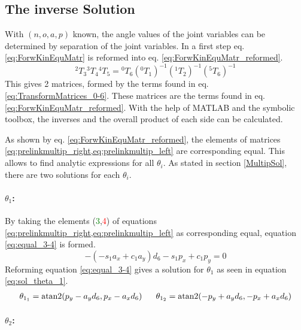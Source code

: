 \subsection{The inverse Solution} \label{InverseSol}
With $ (n,o,a,p) $ known, the angle values of the joint variables can be determined by separation of the joint variables. 
In a first step eq. \ref{eq:ForwKinEquMatr} is reformed into eq. \ref{eq:ForwKinEquMatr_reformed}.
\begin{equation}\label{eq:ForwKinEquMatr_reformed}
	\phantom{}^2T_3\phantom{}^3T_4\phantom{}^4T_5 = \phantom{}^0T_6(\phantom{}^0T_1)^{-1}(\phantom{}^1T_2)^{-1}(\phantom{}^5T_6)^{-1}
\end{equation}
This gives 2 matrices, formed by the terms found in eq. \ref{eq:TransformMatrices_0-6}. These matrices are the terms found in eq. \ref{eq:ForwKinEquMatr_reformed}.
With the help of MATLAB and the symbolic toolbox, the inverses and the overall product of each side can be calculated. %

	


As shown by eq. \ref{eq:ForwKinEquMatr_reformed}, the elements of matrices \cref{eq:prelinkmultip_right,eq:prelinkmultip_left} are corresponding equal. This allows to find analytic expressions for all $\theta_i$. As stated in section \ref{MultipSol}, there are two solutions for each $\theta_i$.
\medskip


\paragraph{$\theta_1$:}

By taking the elements (\textcolor{green}{3},\textcolor{red}{4}) of equations \cref{eq:prelinkmultip_right,eq:prelinkmultip_left} as corresponding equal, equation \ref{eq:equal_3-4} is formed.
\begin{equation}\label{eq:equal_3-4}
	-(-s_1a_x + c_1 a_y )d_6 - s_1 p_x +c_1 p_y = 0
\end{equation}
Reforming equation \ref{eq:equal_3-4} gives a solution for $\theta_1$ as seen in equation \ref{eq:sol_theta_1}.
\begin{multline}\label{eq:sol_theta_1}
	\theta_{1_1} = \operatorname{atan2} ( p_y - a_y d_6 , p_x - a_x d_6) 
	\phantom{......}
	\theta_{1_2} = \operatorname{atan2} (-p_y + a_y d_6 ,-p_x + a_x d_6) 
\end{multline}
\medskip

\paragraph{$\theta_2$:}

